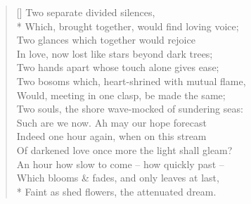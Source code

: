 \documentclass[MAIN]{subfiles}
\begin{document}
\settowidth{\versewidth}{\vin Two bosoms which, heart-shrined with mutual flame,}
\begin{verse}[\versewidth]
Two separate divided silences,\\*
\vin Which, brought together, would find loving voice;\\
\vin Two glances which together would rejoice\\
In love, now lost like stars beyond dark trees;\\
Two hands apart whose touch alone gives ease;\\
\vin Two bosoms which, heart-shrined with mutual flame,\\
\vin Would, meeting in one clasp, be made the same;\\
Two souls, the shore wave-mocked of sundering seas:\\
Such are we now. Ah may our hope forecast\\
\vin Indeed one hour again, when on this stream\\
\vin Of darkened love once more the light shall gleam?\\
An hour how slow to come -- how quickly past --\\
Which blooms \& fades, and only leaves at last,\\*
\vin Faint as shed flowers, the attenuated dream.
\end{verse}
\end{document}
